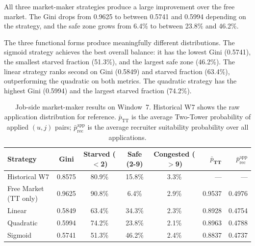 All three market-maker strategies produce a large improvement over the free
market. The Gini drops from 0.9625 to between 0.5741 and 0.5994 depending on
the strategy, and the safe zone grows from 6.4\% to between 23.8\% and 46.2\%.

The three functional forms produce meaningfully different distributions. The
sigmoid strategy achieves the best overall balance: it has the lowest Gini
(0.5741), the smallest starved fraction (51.3\%), and the largest safe zone
(46.2\%). The linear strategy ranks second on Gini (0.5849) and starved
fraction (63.4\%), outperforming the quadratic on both metrics. The quadratic
strategy has the highest Gini (0.5994) and the largest starved fraction
(74.2\%).
\begin{table}[htbp]

    \centering
    \caption{Job-side market-maker results on Window~7. Historical W7 shows
    the raw application distribution for reference. $\bar{p}_{\text{TT}}$ is
    the average Two-Tower probability of applied $(u,j)$ pairs;
    $\bar{p}_{\text{rec}}^{\text{app}}$ is the average recruiter suitability probability over all applications.}
    \label{tab:job_mm_results}
    \begin{tabular}{@{}lccccrr@{}}
        \toprule
        \textbf{Strategy} & \textbf{Gini} & \textbf{Starved ($<$2)} & \textbf{Safe (2-9)} & \textbf{Congested ($>$9)} & $\bar{p}_{\textbf{TT}}$ & $\bar{p}_{\text{rec}}^{\text{app}}$ \\
        \midrule
        Historical W7         & 0.8575 & 80.9\% & 15.8\% & 3.3\% & ---    & ---    \\
        Free Market (TT only) & 0.9625 & 90.8\% &  6.4\% & 2.9\% & 0.9537 & 0.4976 \\
        \midrule
        Linear                & 0.5849 & 63.4\% & 34.3\% & 2.3\% & 0.8928 & 0.4754 \\
        Quadratic             & 0.5994 & 74.2\% & 23.8\% & 2.1\% & 0.8963 & 0.4788 \\
        Sigmoid               & 0.5741 & 51.3\% & 46.2\% & 2.4\% & 0.8837 & 0.4737 \\
        \bottomrule
    \end{tabular}
\end{table}

